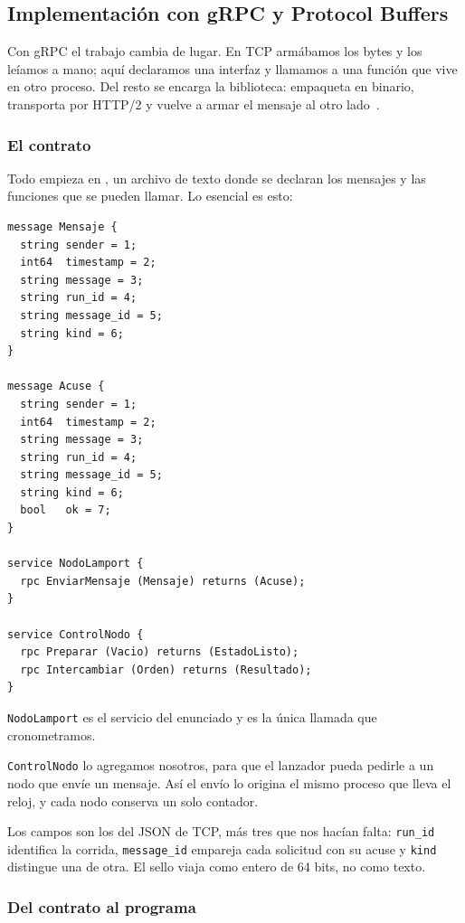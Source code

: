 \subsection{Implementación con gRPC y Protocol Buffers}
\label{sec:grpc}

Con gRPC el trabajo cambia de lugar. En TCP armábamos los bytes y los leíamos a
mano; aquí declaramos una interfaz y llamamos a una función que vive en otro
proceso. Del resto se encarga la biblioteca: empaqueta en binario, transporta por
HTTP/2 y vuelve a armar el mensaje al otro lado~\cite{thomson2022http2}.

\subsubsection{El contrato}

Todo empieza en , un archivo de texto donde se declaran
los mensajes y las funciones que se pueden llamar. Lo esencial es esto:

\begin{verbatim}
message Mensaje {
  string sender = 1;
  int64  timestamp = 2;
  string message = 3;
  string run_id = 4;
  string message_id = 5;
  string kind = 6;
}

message Acuse {
  string sender = 1;
  int64  timestamp = 2;
  string message = 3;
  string run_id = 4;
  string message_id = 5;
  string kind = 6;
  bool   ok = 7;
}

service NodoLamport {
  rpc EnviarMensaje (Mensaje) returns (Acuse);
}

service ControlNodo {
  rpc Preparar (Vacio) returns (EstadoListo);
  rpc Intercambiar (Orden) returns (Resultado);
}
\end{verbatim}

\texttt{NodoLamport} es el servicio del enunciado y es la única llamada que
cronometramos.

\texttt{ControlNodo} lo agregamos nosotros, para que el lanzador pueda pedirle a un
nodo que envíe un mensaje. Así el envío lo origina el mismo proceso que lleva el
reloj, y cada nodo conserva un solo contador.

Los campos son los del JSON de TCP, más tres que nos hacían falta:
\texttt{run\_id} identifica la corrida, \texttt{message\_id} empareja cada
solicitud con su acuse y \texttt{kind} distingue una de otra. El sello viaja como
entero de 64 bits, no como texto.

\subsubsection{Del contrato al programa}

